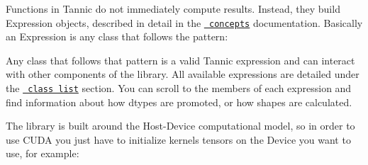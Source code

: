 Functions in Tannic do not immediately compute results. Instead, they build Expression objects, described in detail in the \href{https://entropy-flux.github.io/Tannic/concepts.html}{\texttt{ concepts}} documentation. Basically an {\ttfamily Expression} is any class that follows the pattern\+:


\begin{DoxyCode}{0}
\DoxyCodeLine{\};\ }

\end{DoxyCode}


Any class that follows that pattern is a valid Tannic expression and can interact with other components of the library. All available expressions are detailed under the \href{https://entropy-flux.github.io/Tannic/annotated.html}{\texttt{ class list}} section. You can scroll to the members of each expression and find information about how dtypes are promoted, or how shapes are calculated.

The library is built around the Host-\/\+Device computational model, so in order to use CUDA you just have to initialize kernels tensors on the Device you want to use, for example\+:


